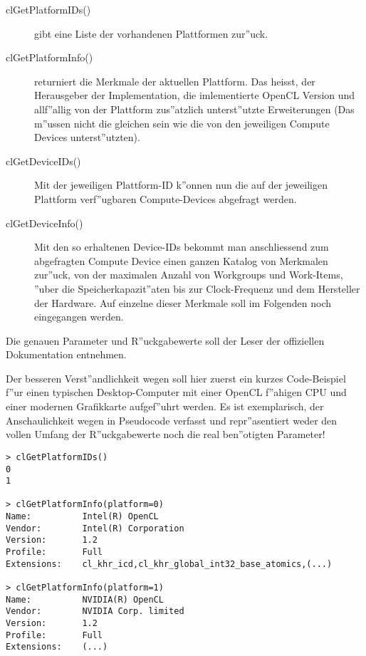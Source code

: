 \begin{refsection}
\begin{description}
 \item [clGetPlatformIDs()] gibt eine Liste der vorhandenen Plattformen zur''uck.
 \item [clGetPlatformInfo()] returniert die Merkmale der aktuellen Plattform. Das heisst,
                            der Herausgeber der Implementation, die imlementierte 
                            OpenCL Version und allf''allig von der Plattform 
                            zus''atzlich unterst''utzte Erweiterungen (Das m''ussen
                            nicht die gleichen sein wie die von den jeweiligen
                            Compute Devices unterst''utzten).
 \item [clGetDeviceIDs()]   Mit der jeweiligen Plattform-ID k''onnen nun die auf der 
                            jeweiligen Plattform verf''ugbaren Compute-Devices abgefragt 
                            werden.
 \item [clGetDeviceInfo()]  Mit den so erhaltenen Device-IDs bekommt man anschliessend 
                            zum abgefragten Compute Device einen ganzen Katalog von
                            Merkmalen zur''uck, von der maximalen Anzahl von Workgroups
                            und Work-Items, ''uber die Speicherkapazit''aten bis zur 
                            Clock-Frequenz und dem Hersteller der Hardware. Auf einzelne 
                            dieser Merkmale soll im Folgenden noch eingegangen werden.
\end{description}

Die genauen Parameter und R''uckgabewerte soll der Leser der offiziellen Dokumentation
\cite{crypto:opencl_ref} entnehmen.

Der besseren Verst''andlichkeit wegen soll hier zuerst ein kurzes Code-Beispiel f''ur 
einen typischen Desktop-Computer mit einer OpenCL f''ahigen CPU und einer modernen 
Grafikkarte aufgef''uhrt werden. Es ist exemplarisch, der Anschaulichkeit wegen in
Pseudocode verfasst und repr''asentiert weder den vollen Umfang der 
R''uckgabewerte noch die real ben''otigten Parameter!

\begin{verbatim}
> clGetPlatformIDs()
0
1

> clGetPlatformInfo(platform=0)
Name:          Intel(R) OpenCL
Vendor:        Intel(R) Corporation
Version:       1.2
Profile:       Full
Extensions:    cl_khr_icd,cl_khr_global_int32_base_atomics,(...)

> clGetPlatformInfo(platform=1)
Name:          NVIDIA(R) OpenCL
Vendor:        NVIDIA Corp. limited
Version:       1.2
Profile:       Full
Extensions:    (...)


\end{verbatim}
\end{refsection}
